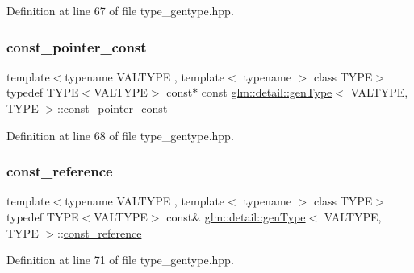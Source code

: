 Definition at line 67 of file type\+\_\+gentype.\+hpp.

\mbox{\label{structglm_1_1detail_1_1gen_type_a4f3f1bc18abdbdba5757fc63052157fa}} 
\subsubsection{\texorpdfstring{const\+\_\+pointer\+\_\+const}{const\_pointer\_const}}
{\footnotesize\ttfamily template$<$typename V\+A\+L\+T\+Y\+PE , template$<$ typename $>$ class T\+Y\+PE$>$ \\
typedef T\+Y\+PE$<$V\+A\+L\+T\+Y\+PE$>$ const$\ast$ const \hyperlink{structglm_1_1detail_1_1gen_type}{glm\+::detail\+::gen\+Type}$<$ V\+A\+L\+T\+Y\+PE, T\+Y\+PE $>$\+::\hyperlink{structglm_1_1detail_1_1gen_type_a4f3f1bc18abdbdba5757fc63052157fa}{const\+\_\+pointer\+\_\+const}}



Definition at line 68 of file type\+\_\+gentype.\+hpp.

\mbox{\label{structglm_1_1detail_1_1gen_type_a509ca374a85f8a9ea319bc5a980d5f1a}} 
\subsubsection{\texorpdfstring{const\+\_\+reference}{const\_reference}}
{\footnotesize\ttfamily template$<$typename V\+A\+L\+T\+Y\+PE , template$<$ typename $>$ class T\+Y\+PE$>$ \\
typedef T\+Y\+PE$<$V\+A\+L\+T\+Y\+PE$>$ const\& \hyperlink{structglm_1_1detail_1_1gen_type}{glm\+::detail\+::gen\+Type}$<$ V\+A\+L\+T\+Y\+PE, T\+Y\+PE $>$\+::\hyperlink{structglm_1_1detail_1_1gen_type_a509ca374a85f8a9ea319bc5a980d5f1a}{const\+\_\+reference}}



Definition at line 71 of file type\+\_\+gentype.\+hpp.

\mbox{\label{structglm_1_1detail_1_1gen_type_a92c8b989f574a63d4e0f5bfc8a4f3a32}} 

